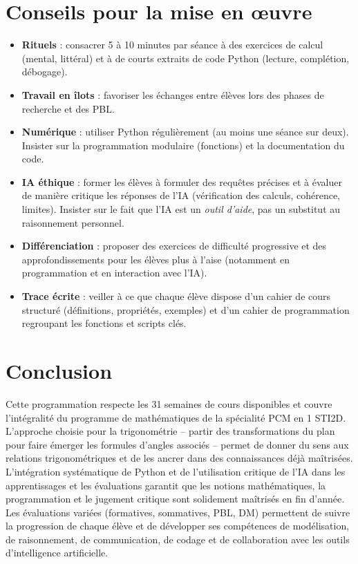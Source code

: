 \documentclass[a4paper,12pt]{article}
\begin{document}
	\section{Conseils pour la mise en œuvre}
	\begin{itemize}
		\item \textbf{Rituels} : consacrer 5 à 10 minutes par séance à des exercices de calcul (mental, littéral) et à de courts extraits de code Python (lecture, complétion, débogage).
		\item \textbf{Travail en îlots} : favoriser les échanges entre élèves lors des phases de recherche et des PBL.
		\item \textbf{Numérique} : utiliser Python régulièrement (au moins une séance sur deux). Insister sur la programmation modulaire (fonctions) et la documentation du code.
		\item \textbf{IA éthique} : former les élèves à formuler des requêtes précises et à évaluer de manière critique les réponses de l’IA (vérification des calculs, cohérence, limites). Insister sur le fait que l’IA est un \emph{outil d’aide}, pas un substitut au raisonnement personnel.
		\item \textbf{Différenciation} : proposer des exercices de difficulté progressive et des approfondissements pour les élèves plus à l’aise (notamment en programmation et en interaction avec l’IA).
		\item \textbf{Trace écrite} : veiller à ce que chaque élève dispose d’un cahier de cours structuré (définitions, propriétés, exemples) et d’un cahier de programmation regroupant les fonctions et scripts clés.
	\end{itemize}
	
	\section*{Conclusion}
	Cette programmation respecte les 31 semaines de cours disponibles et couvre l’intégralité du programme de mathématiques de la spécialité PCM en 1 STI2D. L’approche choisie pour la trigonométrie – partir des transformations du plan pour faire émerger les formules d’angles associés – permet de donner du sens aux relations trigonométriques et de les ancrer dans des connaissances déjà maîtrisées. L’intégration systématique de Python et de l’utilisation critique de l’IA dans les apprentissages et les évaluations garantit que les notions mathématiques, la programmation et le jugement critique sont solidement maîtrisés en fin d’année. Les évaluations variées (formatives, sommatives, PBL, DM) permettent de suivre la progression de chaque élève et de développer ses compétences de modélisation, de raisonnement, de communication, de codage et de collaboration avec les outils d’intelligence artificielle.
	
\end{document}
